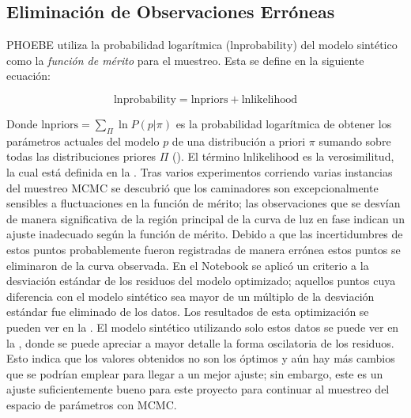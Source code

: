 \subsection{Eliminación de Observaciones Erróneas} \label{metodologia:modelocomputacional:mcmc:eliminacion_errores}

PHOEBE utiliza la probabilidad logarítmica ($\mathrm{lnprobability}$) del modelo
sintético como la \textit{función de mérito} para el muestreo. Esta se define en
la siguiente ecuación:

\begin{eqfloat}[!ht]
	\centering
	\begin{equation}
		\textrm{lnprobability} = \textrm{lnpriors} + \textrm{lnlikelihood}
	\end{equation}
\end{eqfloat}

Donde $\mathrm{lnpriors} = \sum_{\Pi} \ln{P(p | \pi)}$ es la probabilidad
logarítmica de obtener los parámetros actuales del modelo $p$ de una
distribución a priori $\pi$ sumando sobre todas las distribuciones priores $\Pi$
(). El
término $\mathrm{lnlikelihood}$ es la verosimilitud, la cual está definida en
la . Tras varios experimentos corriendo
varias instancias del muestreo MCMC se descubrió que los caminadores son
excepcionalmente sensibles a fluctuaciones en la función de mérito; las
observaciones que se desvían de manera significativa de la región principal de
la curva de luz en fase indican un ajuste inadecuado según la función de mérito.
Debido a que las incertidumbres de estos puntos probablemente fueron registradas
de manera errónea estos puntos se eliminaron de la curva observada. En el
Notebook
\href{https://github.com/KnightIV/UANL_MAPTA_Observaciones/blob/main/analisis/phoebe_model/sampling/remove-bad-observations.ipynb}{}
se aplicó un criterio a la desviación estándar de los residuos del modelo
optimizado; aquellos puntos cuya diferencia con el modelo sintético sea mayor de
un múltiplo de la desviación estándar fue eliminado de los datos. Los resultados
de esta optimización se pueden ver en la
. El modelo sintético utilizando
solo estos datos se puede ver en la
, donde se puede apreciar a
mayor detalle la forma oscilatoria de los residuos. Esto indica que los valores
obtenidos no son los óptimos y aún hay más cambios que se podrían emplear para
llegar a un mejor ajuste; sin embargo, este es un ajuste suficientemente bueno
para este proyecto para continuar al muestreo del espacio de parámetros con
MCMC.


